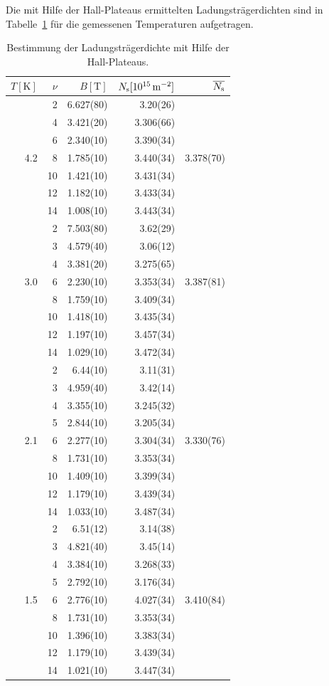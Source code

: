 \documentclass[paper=a4,fontsize=10pt,DIV=18,twocolumn,parskip=half]{scrartcl}
\numberwithin{equation}{section}    %
\begin{document}
Die mit Hilfe der Hall-Plateaus ermittelten Ladungsträgerdichten sind in Tabelle~\ref{ladungstraegerdichte2} für die gemessenen Temperaturen aufgetragen.
\begin{table}[htp]
	\begin{center}
	\begin{tabular}{r|rrr|r}
		\hline
			$T[\mathrm{K}]$ & $\nu$ & $B[\mathrm{T}]$ & $N_{\rm s}[10^{15}\,\mathrm{m}^{-2}]$ & $\overline{N_{\rm s}}$\\
		\hline
			 &  2 & 6.627(80) & 3.20(26)&\\
			 &  4 & 3.421(20) & 3.306(66)&\\
			 &  6 & 2.340(10) & 3.390(34)&\\
			4.2 &  8 & 1.785(10) & 3.440(34)& 3.378(70)\\
			 & 10 & 1.421(10) & 3.431(34)&\\
			 & 12 & 1.182(10) & 3.433(34)&\\
			 & 14 & 1.008(10) & 3.443(34)&\\
			\hline
			 &  2 & 7.503(80) & 3.62(29)&\\
			 &  3 & 4.579(40) & 3.06(12)&\\
			 &  4 & 3.381(20) & 3.275(65)&\\
			3.0 &  6 & 2.230(10) & 3.353(34)& 3.387(81)\\
			 &  8 & 1.759(10) & 3.409(34)&\\
			 & 10 & 1.418(10) & 3.435(34)&\\
			 & 12 & 1.197(10) & 3.457(34)&\\
			 & 14 & 1.029(10) & 3.472(34)&\\
			\hline
			 &  2 & 6.44(10) & 3.11(31)&\\
			 &  3 & 4.959(40) & 3.42(14)&\\
			 &  4 & 3.355(10) & 3.245(32)&\\
			 &  5 & 2.844(10) & 3.205(34)&\\
			2.1 &  6 & 2.277(10) & 3.304(34)& 3.330(76)\\
			 &  8 & 1.731(10) & 3.353(34)&\\
			 & 10 & 1.409(10) & 3.399(34)&\\
			 & 12 & 1.179(10) & 3.439(34)&\\
			 & 14 & 1.033(10) & 3.487(34)&\\
			\hline
			 &  2 & 6.51(12) & 3.14(38)&\\
			 &  3 & 4.821(40) & 3.45(14)&\\
			 &  4 & 3.384(10) & 3.268(33)&\\
			 &  5 & 2.792(10) & 3.176(34)&\\
			1.5 &  6 & 2.776(10) & 4.027(34)& 3.410(84)\\
			 &  8 & 1.731(10) & 3.353(34)&\\
			 & 10 & 1.396(10) & 3.383(34)&\\
			 & 12 & 1.179(10) & 3.439(34)&\\
			 & 14 & 1.021(10) & 3.447(34)&\\
		\hline	
	\end{tabular}	
	\caption{Bestimmung der Ladungsträgerdichte mit Hilfe der Hall-Plateaus.}
	\label{ladungstraegerdichte2}
	\end{center}
\end{table}
\end{document}
